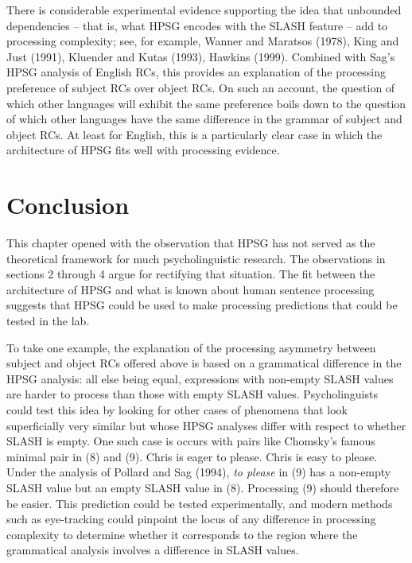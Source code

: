 \documentclass[a4paper]{article}
\begin{document}
There is considerable experimental evidence supporting the idea that unbounded dependencies -- that is, what HPSG encodes with the SLASH feature -- add to processing complexity; see, for example, Wanner and Maratsos (1978), King and Just (1991), Kluender and Kutas (1993), Hawkins (1999).  Combined with Sag's HPSG analysis of English RCs, this provides an explanation of the processing preference of subject RCs over object RCs.  On such an account, the question of which other languages will exhibit the same preference boils down to the question of which other languages have the same difference in the grammar of subject and object RCs.  At least for English, this is a particularly clear case in which the architecture of HPSG fits well with processing evidence.

\section{Conclusion}

This chapter opened with the observation that HPSG has not served as the theoretical framework for much psycholinguistic research.  The observations in sections 2 through 4 argue for rectifying that situation.  The fit between the architecture of HPSG and what is known about human sentence processing suggests that HPSG could be used to make processing predictions that could be tested in the lab.  

To take one example, the explanation of the processing asymmetry between subject and object RCs offered above is based on a grammatical difference in the HPSG analysis:  all else being equal, expressions with non-empty SLASH values are harder to process than those with empty SLASH values.  Psycholinguists could test this idea by looking for other cases of phenomena that look superficially very similar but whose HPSG analyses differ with respect to whether SLASH is empty.  One such case is occurs with pairs like Chomsky's famous minimal pair in (8) and (9).
\eal
\ex Chris is eager to please.
\ex Chris is easy to please.
\zl
Under the analysis of Pollard and Sag (1994), {\it to please} in (9) has a non-empty SLASH value but an empty SLASH value in (8).  Processing (9) should therefore be easier.  This prediction could be tested experimentally, and modern methods such as eye-tracking could pinpoint the locus of any difference in processing complexity to determine whether it corresponds to the region where the grammatical analysis involves a difference in SLASH values.
\end{document}
